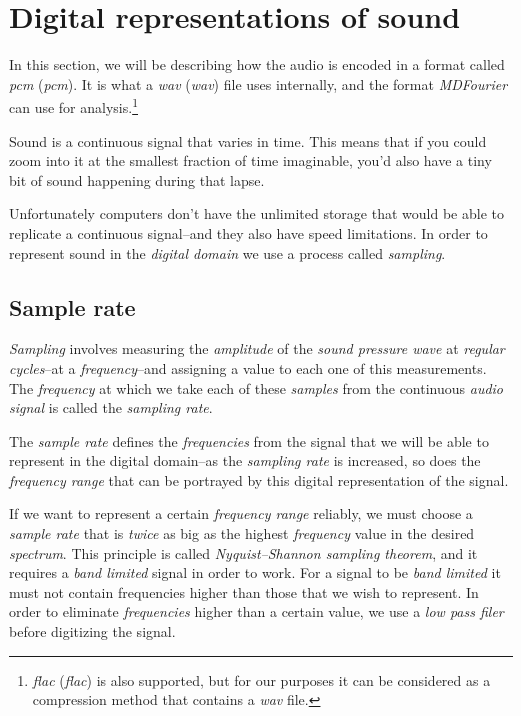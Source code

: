 \documentclass[10pt,a4paper]{report}
\newcommand{\define}[1]{\textit{\acrlong{#1}} (\textit{\acrshort{#1}})}
\newcommand{\ac}[1]{\textit{\mbox{\acrshort{#1}}}}
\begin{document}
\section{Digital representations of sound}

In this section, we will be describing how the audio is encoded in a format called \define{pcm}. It is what a \define{wav} file uses internally, and the format \textit{MDFourier} can use for analysis.\footnote{\define{flac} is also supported, but for our purposes it can be considered as a compression method that contains a \ac{wav} file.}

Sound is a continuous signal that varies in time. This means that if you could zoom into it at the smallest fraction of time imaginable, you'd also have a tiny bit of sound happening during that lapse. 

Unfortunately computers don't have the unlimited storage that would be able to replicate a continuous signal--and they also have speed limitations. In order to represent sound in the \textit{digital domain} we use a process called \textit{sampling}. 

\subsection{Sample rate}

\textit{Sampling} involves measuring the \textit{amplitude} of the \textit{sound pressure wave} at \textit{regular cycles}--at a \textit{frequency}--and assigning a value to each one of this measurements. The \textit{frequency} at which we take each of these \textit{samples} from the continuous \textit{audio signal} is called the \textit{sampling rate}. 

The \textit{sample rate} defines the \textit{frequencies} from the signal that we will be able to represent in the digital domain--as the \textit{sampling rate} is increased, so does the \textit{frequency range} that can be portrayed by this digital representation of the signal. 

If we want to represent a certain \textit{frequency range} reliably, we must choose a \textit{sample rate} that is \textit{twice} as big as the highest \textit{frequency} value in the desired \textit{spectrum}. This principle is called  \textit{Nyquist–Shannon sampling theorem}, and it requires a \textit{band limited} signal in order to work. For a signal to be \textit{band limited} it must not contain frequencies higher than those that we wish to represent. In order to eliminate \textit{frequencies} higher than a certain value, we use a \textit{low pass filer} before digitizing the signal.
\end{document}
